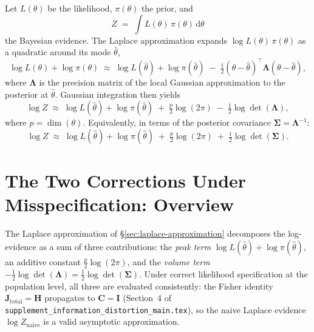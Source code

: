 \documentclass[11pt]{article}
\begin{document}
Let $L(\theta)$ be the likelihood, $\pi(\theta)$ the prior, and
\begin{equation}
Z
\;=\;
\int L(\theta)\,\pi(\theta)\,\mathrm{d}\theta
\end{equation}
the Bayesian evidence. The Laplace approximation expands $\log L(\theta)\,\pi(\theta)$ as a quadratic around its mode $\hat\theta$,
\begin{equation}
\log L(\theta) + \log\pi(\theta)
\;\approx\;
\log L(\hat\theta) + \log\pi(\hat\theta)
\;-\;
\tfrac{1}{2}(\theta - \hat\theta)^\top \boldsymbol\Lambda (\theta - \hat\theta),
\end{equation}
where $\boldsymbol\Lambda$ is the precision matrix of the local Gaussian approximation to the posterior at $\hat\theta$. Gaussian integration then yields
\begin{equation}
\log Z
\;\approx\;
\log L(\hat\theta) + \log\pi(\hat\theta)
\;+\;
\tfrac{p}{2}\log(2\pi)
\;-\;
\tfrac{1}{2}\log\det(\boldsymbol\Lambda),
\label{eq:laplace-precision}
\end{equation}
where $p = \dim(\theta)$. Equivalently, in terms of the posterior covariance $\boldsymbol\Sigma = \boldsymbol\Lambda^{-1}$:
\begin{equation}
\log Z
\;\approx\;
\log L(\hat\theta) + \log\pi(\hat\theta)
\;+\;
\tfrac{p}{2}\log(2\pi)
\;+\;
\tfrac{1}{2}\log\det(\boldsymbol\Sigma).
\label{eq:laplace-cov}
\end{equation}


\section{The Two Corrections Under Misspecification: Overview}
\label{sec:two-corrections-overview-lik}

The Laplace approximation of \S\ref{sec:laplace-approximation} decomposes the
log-evidence as a sum of three contributions: the \emph{peak term}
$\log L(\hat\theta) + \log\pi(\hat\theta)$, an additive constant
$\tfrac{p}{2}\log(2\pi)$, and the \emph{volume term}
$-\tfrac{1}{2}\log\det(\boldsymbol\Lambda) =
\tfrac{1}{2}\log\det(\boldsymbol\Sigma)$. Under correct likelihood
specification at the population level, all three are evaluated consistently:
the Fisher identity $\mathbf J_{\mathrm{total}} = \mathbf H$ propagates to
$\mathbf C = \mathbf I$ (Section~4 of \texttt{supplement\_information\_distortion\_main.tex}),
so the naive Laplace evidence $\log Z_{\mathrm{naive}}$ is a valid asymptotic
approximation.
\end{document}
